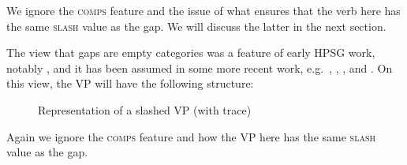 \documentclass[output=paper
,notxmath 
 	        ,biblatex
                ,babelshorthands
                ,newtxmath
                ,draftmode
                ,colorlinks, citecolor=brown
]{langscibook}
\begin{document}
\noindent
We ignore the \textsc{comps} feature and the issue of what ensures that the verb
here has the same \textsc{slash} value as the gap. We will discuss the latter in
the next section.

The view that gaps are empty categories was a feature of early HPSG
work, notably \citet[Chapter~4]{Pollard:Sag:94}, and it has been assumed in some
more recent work, e.g.\ \citet[191,385]{Levine:Hukari:06}, \citet{Borsley:09a},
\citet[Section~4.2]{Borsley:13}, and \citet{Mueller:14b}. On
this view, the VP will have the following structure:

\begin{figure}
{}
    \caption{\label{fig:UDC:21}Representation of a slashed VP (with trace)}  
\end{figure}


\noindent
Again we ignore the \textsc{comps} feature and how the VP here has the same \textsc{slash}
value as the gap.
\end{document}
